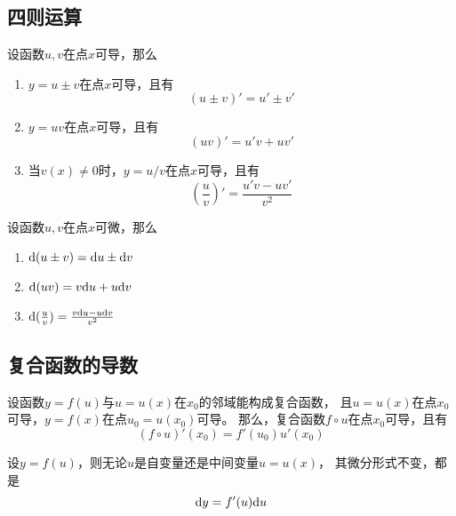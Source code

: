 \subsection{四则运算}
\begin{theorem}[导数的四则运算]
  设函数$u,v$在点$x$可导，那么
  \begin{enumerate}
    \item
    $y=u\pm v$在点$x$可导，且有
    \begin{displaymath}
      (u\pm v)'=u'\pm v'
    \end{displaymath}
    \item
    $y=uv$在点$x$可导，且有
    \begin{displaymath}
      (uv)' = u'v+uv'
    \end{displaymath}
    \item
    当$v(x)\neq 0$时，$y=u/v$在点$x$可导，且有
    \begin{displaymath}
      \left(\frac{u}{v}\right)'=\frac{u'v-uv'}{v^2}
    \end{displaymath}
  \end{enumerate}
\end{theorem}

\begin{theorem}[微分的四则运算]
  设函数$u,v$在点$x$可微，那么
  \begin{enumerate}
    \item
    $\textrm{d} (u\pm v) = \textrm{d} u \pm \textrm{d} v$
    \item
    $\textrm{d} (uv) = v\textrm{d} u + u \textrm{d} v$
    \item
    $\textrm{d} (\frac{u}{v}) = \frac{v\textrm{d} u - u\textrm{d} v}{v^2}$
  \end{enumerate}
\end{theorem}

\subsection{复合函数的导数}
\begin{theorem}[复合函数的导数]
  设函数$y=f(u)$与$u=u(x)$在$x_0$的邻域能构成复合函数，
  且$u=u(x)$在点$x_0$可导，$y=f(x)$在点$u_0=u(x_0)$可导。
  那么，复合函数$f\circ u$在点$x_0$可导，且有
  \begin{displaymath}
    (f\circ u)'(x_0) = f'(u_0)u'(x_0)
  \end{displaymath}
\end{theorem}

\begin{corollary}[一阶微分形式不变性]
  设$y=f(u)$，则无论$u$是自变量还是中间变量$u=u(x)$，
  其微分形式不变，都是
  \begin{displaymath}
    \textrm{d} y = f'(u)\textrm{d} u
  \end{displaymath}
\end{corollary}

